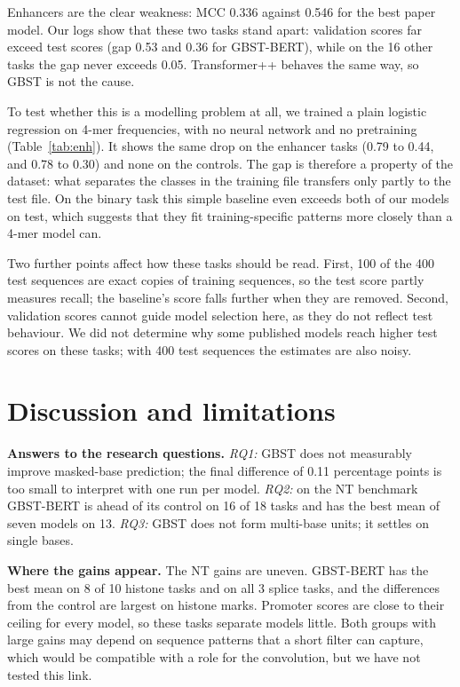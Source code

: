 \documentclass{article}
\begin{document}
Enhancers are the clear weakness: MCC 0.336 against 0.546 for the best paper model. Our logs show that
these two tasks stand apart: validation scores far exceed test scores (gap 0.53 and 0.36 for
GBST-BERT), while on the 16 other tasks the gap never exceeds 0.05. Transformer++ behaves the same
way, so GBST is not the cause.

To test whether this is a modelling problem at all, we trained a plain logistic regression on 4-mer
frequencies, with no neural network and no pretraining (Table~\ref{tab:enh}). It shows the same drop
on the enhancer tasks (0.79 to 0.44, and 0.78 to 0.30) and none on the controls. The gap is therefore
a property of the dataset: what separates the classes in the training file transfers only partly to
the test file. On the binary task this simple baseline even exceeds both of our models on test,
which suggests that they fit training-specific patterns more closely than a 4-mer model can.

Two further points affect how these tasks should be read. First, 100 of the 400 test sequences are
exact copies of training sequences, so the test score partly measures recall; the baseline's score
falls further when they are removed. Second, validation scores cannot guide model selection here, as
they do not reflect test behaviour. We did not determine why some published models reach higher test
scores on these tasks; with 400 test sequences the estimates are also noisy.

\section{Discussion and limitations}\label{sec:disc}

\textbf{Answers to the research questions.} \emph{RQ1:} GBST does not measurably improve masked-base
prediction; the final difference of 0.11 percentage points is too small to interpret with one run per
model. \emph{RQ2:} on the NT benchmark GBST-BERT is ahead of its control on 16 of 18 tasks and has the
best mean of seven models on 13.
\emph{RQ3:} GBST does not form multi-base units; it settles on single bases.

\textbf{Where the gains appear.} The NT gains are uneven. GBST-BERT has the best mean on 8 of 10 histone
tasks and on all 3 splice tasks, and the differences from the control are largest on histone marks.
Promoter scores are close to their ceiling for every model, so these tasks separate models little.
Both groups with large gains may depend on sequence patterns that a short filter can capture, which
would be compatible with a role for the convolution, but we have not tested this link.
\end{document}
